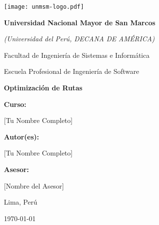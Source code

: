 \begin{titlepage}
    \centering %

    \texttt{[image: unmsm-logo.pdf]}\par %
    
    \vspace{1cm} %
    
    {\Large \textbf{Universidad Nacional Mayor de San Marcos}}\par
    {\large \textit{(Universidad del Perú, DECANA DE AMÉRICA)}}\par
    \vspace{0.5cm}
    {\large Facultad de Ingeniería de Sistemas e Informática}\par
    {\large Escuela Profesional de Ingeniería de Software}\par
    
    \vfill %
    \vspace{0.5cm}
    
    {\huge \bfseries Optimización de Rutas}\par

    \vfill %
    
    \begin{flushleft}
    \large \textbf{Curso:}\par
    \normalsize [Tu Nombre Completo]\par
    [Nombre del Colaborador 1]\par
    [Nombre del Colaborador 2]\par
    \end{flushleft}
    

    
    \begin{flushleft}
    \large \textbf{Autor(es):}\par
    \normalsize [Tu Nombre Completo]\par
    [Nombre del Colaborador 1]\par
    [Nombre del Colaborador 2]\par
    \vspace{1cm}
    \large \textbf{Asesor:}\par
    \normalsize [Nombre del Asesor]\par
    \end{flushleft}

    \vfill
    
    {\large Lima, Perú}\par
    {\large \today}\par %
    
\end{titlepage}